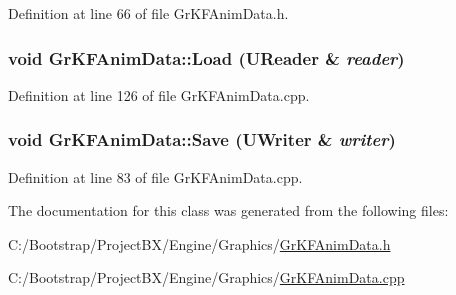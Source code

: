 Definition at line 66 of file GrKFAnimData.h.\hypertarget{class_gr_k_f_anim_data_1cf48bc46744b33fc701998b77f71ead}{
\subsubsection[{Load}]{\setlength{\rightskip}{0pt plus 5cm}void GrKFAnimData::Load ({\bf UReader} \& {\em reader})}}
\label{class_gr_k_f_anim_data_1cf48bc46744b33fc701998b77f71ead}




Definition at line 126 of file GrKFAnimData.cpp.\hypertarget{class_gr_k_f_anim_data_daa2dfc535b931dfcbeb52fcf0630d8c}{
\subsubsection[{Save}]{\setlength{\rightskip}{0pt plus 5cm}void GrKFAnimData::Save ({\bf UWriter} \& {\em writer})}}
\label{class_gr_k_f_anim_data_daa2dfc535b931dfcbeb52fcf0630d8c}




Definition at line 83 of file GrKFAnimData.cpp.

The documentation for this class was generated from the following files:\begin{CompactItemize}
\item 
C:/Bootstrap/ProjectBX/Engine/Graphics/\hyperlink{_gr_k_f_anim_data_8h}{GrKFAnimData.h}\item 
C:/Bootstrap/ProjectBX/Engine/Graphics/\hyperlink{_gr_k_f_anim_data_8cpp}{GrKFAnimData.cpp}\end{CompactItemize}
